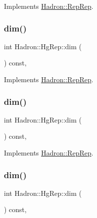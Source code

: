 Implements \mbox{\hyperlink{structHadron_1_1RepRep_a92c8802e5ed7afd7da43ccfd5b7cd92b}{Hadron\+::\+Rep\+Rep}}.

\mbox{\label{structHadron_1_1HgRep_ad951f39b175b012e73b0f66217b25032}} 
\subsubsection{\texorpdfstring{dim()}{dim()}\hspace{0.1cm}{\footnotesize\ttfamily [2/5]}}
{\footnotesize\ttfamily int Hadron\+::\+Hg\+Rep\+::dim (\begin{DoxyParamCaption}{ }\end{DoxyParamCaption}) const\hspace{0.3cm}{\ttfamily [inline]}, {\ttfamily [virtual]}}



Implements \mbox{\hyperlink{structHadron_1_1RepRep_a92c8802e5ed7afd7da43ccfd5b7cd92b}{Hadron\+::\+Rep\+Rep}}.

\mbox{\label{structHadron_1_1HgRep_ad951f39b175b012e73b0f66217b25032}} 
\subsubsection{\texorpdfstring{dim()}{dim()}\hspace{0.1cm}{\footnotesize\ttfamily [3/5]}}
{\footnotesize\ttfamily int Hadron\+::\+Hg\+Rep\+::dim (\begin{DoxyParamCaption}{ }\end{DoxyParamCaption}) const\hspace{0.3cm}{\ttfamily [inline]}, {\ttfamily [virtual]}}



Implements \mbox{\hyperlink{structHadron_1_1RepRep_a92c8802e5ed7afd7da43ccfd5b7cd92b}{Hadron\+::\+Rep\+Rep}}.

\mbox{\label{structHadron_1_1HgRep_ad951f39b175b012e73b0f66217b25032}} 
\subsubsection{\texorpdfstring{dim()}{dim()}\hspace{0.1cm}{\footnotesize\ttfamily [4/5]}}
{\footnotesize\ttfamily int Hadron\+::\+Hg\+Rep\+::dim (\begin{DoxyParamCaption}{ }\end{DoxyParamCaption}) const\hspace{0.3cm}{\ttfamily [inline]}, {\ttfamily [virtual]}}




